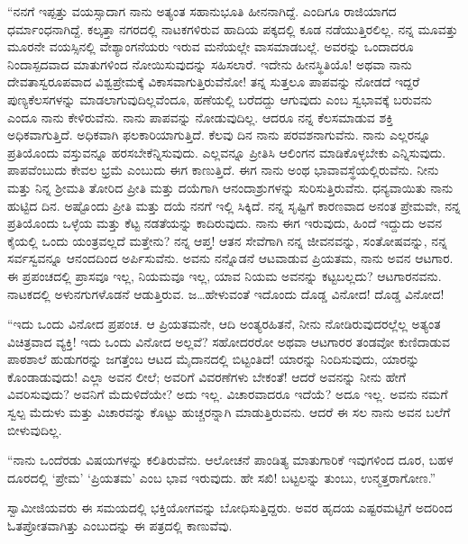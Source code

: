  “ನನಗೆ ಇಪ್ಪತ್ತು ವಯಸ್ಸಾದಾಗ ನಾನು ಅತ್ಯಂತ ಸಹಾನುಭೂತಿ ಹೀನನಾಗಿದ್ದೆ. ಎಂದಿಗೂ ರಾಜಿಯಾಗದ ಧರ್ಮಾಂಧನಾಗಿದ್ದೆ. ಕಲ್ಕತ್ತಾ ನಗರದಲ್ಲಿ ನಾಟಕಗಳಿರುವ ಹಾದಿಯ ಪಕ್ಕದಲ್ಲಿ ಕೂಡ ನಡೆಯುತ್ತಿರಲಿಲ್ಲ. ನನ್ನ ಮೂವತ್ತು ಮೂರನೇ ವಯಸ್ಸಿನಲ್ಲಿ ವೇಶ್ಯಾಂಗನೆಯರು ಇರುವ ಮನೆಯಲ್ಲೇ ವಾಸಮಾಡಬಲ್ಲೆ. ಅವರನ್ನು ಒಂದಾದರೂ ನಿಂದಾಸ್ಪದವಾದ ಮಾತುಗಳಿಂದ ನೋಯಿಸುವುದನ್ನು ಸಹಿಸಲಾರೆ. ಇದೇನು ಹೀನಸ್ಥಿತಿಯೊ! ಅಥವಾ ನಾನು ದೇವತಾಸ್ವರೂಪವಾದ ವಿಶ್ವಪ್ರೇಮಕ್ಕೆ ವಿಕಾಸವಾಗುತ್ತಿರುವೆನೋ! ತನ್ನ ಸುತ್ತಲೂ ಪಾಪವನ್ನು ನೋಡದೆ ಇದ್ದರೆ ಪುಣ್ಯಕೆಲಸಗಳನ್ನು ಮಾಡಲಾಗುವುದಿಲ್ಲವೆಂದೂ, ಹಣೆಯಲ್ಲಿ ಬರೆದದ್ದು ಆಗುವುದು ಎಂಬ ಸ್ವಭಾವಕ್ಕೆ ಬರುವನು ಎಂದೂ ನಾನು ಕೇಳಿರುವೆನು. ನಾನು ಪಾಪವನ್ನು ನೋಡುವುದಿಲ್ಲ. ಆದರೂ ನನ್ನ ಕೆಲಸಮಾಡುವ ಶಕ್ತಿ ಅಧಿಕವಾಗುತ್ತಿದೆ. ಅಧಿಕವಾಗಿ ಫಲಕಾರಿಯಾಗುತ್ತಿದೆ. ಕೆಲವು ದಿನ ನಾನು ಪರವಶನಾಗುವೆನು. ನಾನು ಎಲ್ಲರನ್ನೂ ಪ್ರತಿಯೊಂದು ವಸ್ತುವನ್ನೂ ಹರಸಬೇಕೆನ್ನಿಸುವುದು. ಎಲ್ಲವನ್ನೂ ಪ್ರೀತಿಸಿ ಆಲಿಂಗನ ಮಾಡಿಕೊಳ್ಳಬೇಕು ಎನ್ನಿಸುವುದು. ಪಾಪವೆಂಬುದು ಕೇವಲ ಭ್ರಮೆ ಎಂಬುದು ಈಗ ಕಾಣುತ್ತಿದೆ. ಈಗ ನಾನು ಅಂಥ ಭಾವಾವಸ್ಥೆಯಲ್ಲಿರುವೆನು. ನೀನು ಮತ್ತು ನಿನ್ನ ಶ‍್ರೀಮತಿ ತೋರಿದ ಪ್ರೀತಿ ಮತ್ತು ದಯೆಗಾಗಿ ಆನಂದಾಶ್ರುಗಳನ್ನು ಸುರಿಸುತ್ತಿರುವೆನು. ಧನ್ಯವಾಯಿತು ನಾನು ಹುಟ್ಟಿದ ದಿನ. ಅಷ್ಟೊಂದು ಪ್ರೀತಿ ಮತ್ತು ದಯೆ ನನಗೆ ಇಲ್ಲಿ ಸಿಕ್ಕಿದೆ. ನನ್ನ ಸೃಷ್ಟಿಗೆ ಕಾರಣವಾದ ಅನಂತ ಪ್ರೇಮವೇ, ನನ್ನ ಪ್ರತಿಯೊಂದು ಒಳ್ಳೆಯ ಮತ್ತು ಕೆಟ್ಟ ನಡತೆಯನ್ನು ಕಾದಿರುವುದು. ನಾನು ಈಗ ಇರುವುದು, ಹಿಂದೆ ಇದ್ದುದು ಅವನ ಕೈಯಲ್ಲಿ ಒಂದು ಯಂತ್ರವಲ್ಲದೆ ಮತ್ತೇನು? ನನ್ನ ಆಪ್ತ! ಆತನ ಸೇವೆಗಾಗಿ ನನ್ನ ಜೀವನವನ್ನು, ಸಂತೋಷವನ್ನು, ನನ್ನ ಸರ್ವಸ್ವವನ್ನೂ ಆನಂದದಿಂದ ಅರ್ಪಿಸುವೆನು. ಅವನು ನನ್ನೊಡನೆ ಆಟವಾಡುವ ಪ್ರಿಯತಮ, ನಾನು ಅವನ ಆಟಗಾರ. ಈ ಪ್ರಪಂಚದಲ್ಲಿ ಪ್ರಾಸವೂ ಇಲ್ಲ, ನಿಯಮವೂ ಇಲ್ಲ, ಯಾವ ನಿಯಮ ಅವನನ್ನು ಕಟ್ಟಬಲ್ಲದು? ಆಟಗಾರನವನು. ನಾಟಕದಲ್ಲಿ ಅಳುನಗುಗಳೊಡನೆ ಆಡುತ್ತಿರುವ. ಜ…ಹೇಳುವಂತೆ ಇದೊಂದು ದೊಡ್ಡ ವಿನೋದ! ದೊಡ್ಡ ವಿನೋದ! 

 “ಇದು ಒಂದು ವಿನೋದ ಪ್ರಪಂಚ. ಆ ಪ್ರಿಯತಮನೇ, ಆದಿ ಅಂತ್ಯರಹಿತನೆ, ನೀನು ನೋಡಿರುವುದರಲ್ಲೆಲ್ಲ ಅತ್ಯಂತ ವಿಚಿತ್ರವಾದ ವ್ಯಕ್ತಿ! ಇದು ಒಂದು ವಿನೋದ ಅಲ್ಲವೆ? ಸಹೋದರರೋ ಅಥವಾ ಆಟಗಾರರ ತಂಡವೋ ಕುಣಿದಾಡುವ ಪಾಠಶಾಲೆ ಹುಡುಗರನ್ನು ಜಗತ್ತೆಂಬ ಆಟದ ಮೈದಾನದಲ್ಲಿ ಬಿಟ್ಟಂತಿದೆ! ಯಾರನ್ನು ನಿಂದಿಸುವುದು, ಯಾರನ್ನು ಕೊಂಡಾಡುವುದು! ಎಲ್ಲಾ ಅವನ ಲೀಲೆ; ಅವರಿಗೆ ವಿವರಣೆಗಳು ಬೇಕಂತೆ! ಆದರೆ ಅವನನ್ನು ನೀನು ಹೇಗೆ ವಿವರಿಸುವುದು? ಅವನಿಗೆ ಮೆದುಳಿದೆಯೇ? ಅದು ಇಲ್ಲ. ವಿಚಾರವಾದರೂ ಇದೆಯೆ? ಅದೂ ಇಲ್ಲ. ಅವನು ನಮಗೆ ಸ್ವಲ್ಪ ಮೆದುಳು ಮತ್ತು ವಿಚಾರವನ್ನು ಕೊಟ್ಟು ಹುಚ್ಚರನ್ನಾಗಿ ಮಾಡುತ್ತಿರುವನು. ಆದರೆ ಈ ಸಲ ನಾನು ಅವನ ಬಲೆಗೆ ಬೀಳುವುದಿಲ್ಲ.

 “ನಾನು ಒಂದೆರಡು ವಿಷಯಗಳನ್ನು ಕಲಿತಿರುವೆನು. ಆಲೋಚನೆ ಪಾಂಡಿತ್ಯ ಮಾತುಗಾರಿಕೆ ಇವುಗಳಿಂದ ದೂರ, ಬಹಳ ದೂರದಲ್ಲಿ ‘ಪ್ರೇಮ’ ‘ಪ್ರಿಯತಮ’ ಎಂಬ ಭಾವ ಇರುವುದು. ಹೇ ಸಖಿ! ಬಟ್ಟಲನ್ನು ತುಂಬು, ಉನ್ಮತ್ತರಾಗೋಣ.” 

\newpage

 ಸ್ವಾಮೀಜಿಯವರು ಈ ಸಮಯದಲ್ಲಿ ಭಕ್ತಿಯೋಗವನ್ನು ಬೋಧಿಸುತ್ತಿದ್ದರು. ಅವರ ಹೃದಯ ಎಷ್ಟರಮಟ್ಟಿಗೆ ಅದರಿಂದ ಓತಪ್ರೋತವಾಗಿತ್ತು ಎಂಬುದನ್ನು ಈ ಪತ್ರದಲ್ಲಿ ಕಾಣುವೆವು. 


